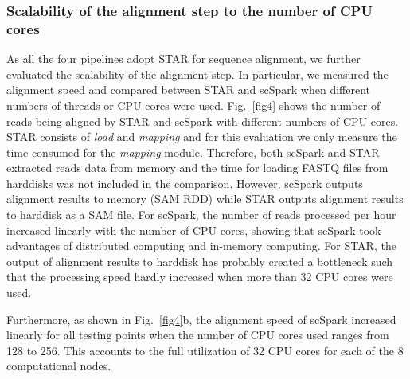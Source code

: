 \documentclass[conference]{IEEEtran}
\begin{document}
\subsubsection{Scalability of the alignment step to the number of CPU cores}
As all the four pipelines adopt STAR for sequence alignment, we further evaluated the scalability of the alignment step. 
In particular, we measured the alignment speed and compared between STAR and scSpark when different numbers of threads or CPU cores were used. 
Fig.~\ref{fig4} shows the number of reads being aligned by STAR and scSpark with different numbers of CPU cores. 
STAR consists of \textit{load} and \textit{mapping} and for this evaluation we only measure the time consumed for the \textit{mapping} module. Therefore, both scSpark and STAR extracted reads data from memory and the time for loading FASTQ files from harddisks was not included in the comparison. However, scSpark outputs alignment results to memory (SAM RDD) while STAR outputs alignment results to harddisk as a SAM file.  
For scSpark, the number of reads processed per hour increased linearly with the number of CPU cores, showing that scSpark took advantages of distributed computing and in-memory computing. 
For STAR, the output of alignment results to harddisk has probably created a bottleneck such that the processing speed hardly increased when more than 32 CPU cores were used. 


Furthermore, as shown in Fig.~\ref{fig4}b, the alignment speed of scSpark increased linearly for all testing points when the number of CPU cores used ranges from 128 to 256. This accounts to the full utilization of 32 CPU cores for each of the 8 computational nodes.  
\end{document}
